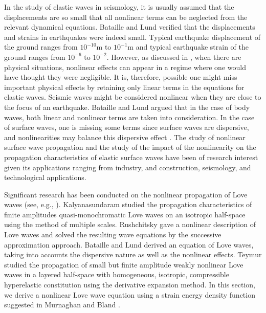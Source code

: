 \documentclass[11pt,letter,subeqn,fleqn]{article}
\numberwithin{equation}{section}
\numberwithin{table}{section}
\numberwithin{figure}{section}
\begin{document}
In the study of elastic waves in seismology, it is usually assumed that the displacements are so small that all nonlinear terms can be neglected from the relevant dynamical equations. Bataille and Lund \cite{bataille1982nonlinear} verified that the displacements and strains in earthquakes were indeed small. Typical earthquake displacement of the ground ranges from $10^{-10} \mathrm{m}$ to $10^{-1}\mathrm{m}$ and typical earthquake strain of the ground ranges from $10^{-6}$ to $10^{-2}$.  However, as discussed in \cite{barut1978solutions}, when there are physical situations, nonlinear effects can appear in a regime where one would have thought they were negligible. It is, therefore, possible one might miss important physical effects by retaining only linear terms in the equations for elastic waves. Seismic waves might be considered nonlinear when they are close to the focus of an earthquake. Bataille and Lund \cite{bataille1982nonlinear} argued that in the case of body waves, both linear and nonlinear terms are taken into consideration.  In the case of surface waves, one is missing some terms since surface waves are dispersive, and nonlinearities may balance this dispersive effect \cite{bataille1982nonlinear}. The study of nonlinear surface wave propagation and the study of the impact of the nonlinearity on the propagation characteristics of elastic surface waves have been of research interest given its applications ranging from industry, and construction, seismology, and technological applications.

Significant research has been conducted on the nonlinear propagation of Love waves (see, e.g., \cite{bataille1982nonlinear,kalyansaundaram1981finite, rushchitsky2013nonlinear,teymur1988nonlinear}). Kalyanasundaram \cite{kalyansaundaram1981finite} studied the propagation characteristics of finite amplitudes quasi-monochromatic Love waves on an isotropic half-space using the method of multiple scales. Rushchitsky \cite{rushchitsky2013nonlinear} gave a nonlinear description of Love waves and solved the resulting wave equations by the successive approximation approach. Bataille and Lund \cite{bataille1982nonlinear} derived an equation of Love waves, taking into accounts the dispersive nature as well as the nonlinear effects. Teymur \cite{teymur1988nonlinear} studied the propagation of small but finite amplitude weakly nonlinear Love waves in a layered half-space with homogeneous, isotropic, compressible hyperelastic constitution using the derivative expansion method. In this section, we derive a nonlinear Love wave equation using a strain energy density function suggested in Murnaghan \cite{murnaghan1951finite} and Bland \cite{bland1969nonlinear}.
\end{document}
